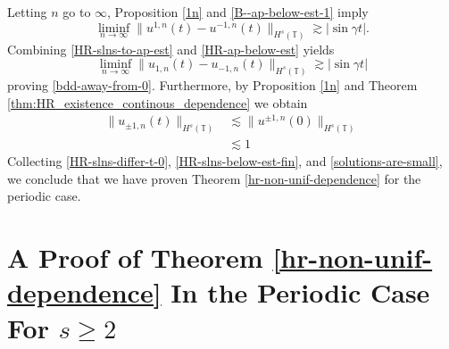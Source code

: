 \documentclass[12pt,reqno]{amsart}
\newcommand{\ci}{\mathbb{T}}
\theoremstyle{plain}  %
\theoremstyle{definition}
\begin{document}
%
%
Letting $n$ go to $\infty$, Proposition \ref{1n}
and \eqref{B--ap-below-est-1} imply
%
%
\begin{equation} 
	\label{HR-ap-below-est}
	\liminf_{n\to\infty}
	\|
	u^{1, n}(t)
	-
	u^{- 1, n}(t)
	\|_{H^s(\ci)}
	\gtrsim
	|\sin \gamma t|.
\end{equation}
%
%
Combining  \eqref{HR-slns-to-ap-est} and  \eqref{HR-ap-below-est}
yields
%
%
\begin{equation} 
	\label{HR-slns-below-est-fin}
	\liminf_{n\to\infty}
	\|
	u_{1, n}(t)
	-
	u_{- 1, n}(t)
	\|_{H^s(\ci)}
	\gtrsim
	|\sin \gamma t|
\end{equation}
%
%
proving \eqref{bdd-away-from-0}. Furthermore, by Proposition \ref{1n} and
Theorem \ref{thm:HR_existence_continous_dependence}  we obtain
\begin{equation}
	\begin{split}
		\label{solutions-are-small}
		\|u_{\pm 1, n} (t) \|_{H^{s}(\ci)}
		& \lesssim \|u^{\pm 1, n}(0) \|_{H^{s}(\ci)}
		\\
		& \lesssim 1
	\end{split}
\end{equation}
Collecting  \eqref{HR-slns-differ-t-0}, \eqref{HR-slns-below-est-fin}, and
\eqref{solutions-are-small}, we conclude that we have proven Theorem
\ref{hr-non-unif-dependence} for the periodic case.
%
%
%
%
%
%	




	 
	 
	 
	 
	 
	 
	 
	 
	 
	\section{
A Proof of Theorem \ref{hr-non-unif-dependence} In the Periodic Case For
$s\ge 2$ }
	\setcounter{equation}{0}
	
\end{document}
